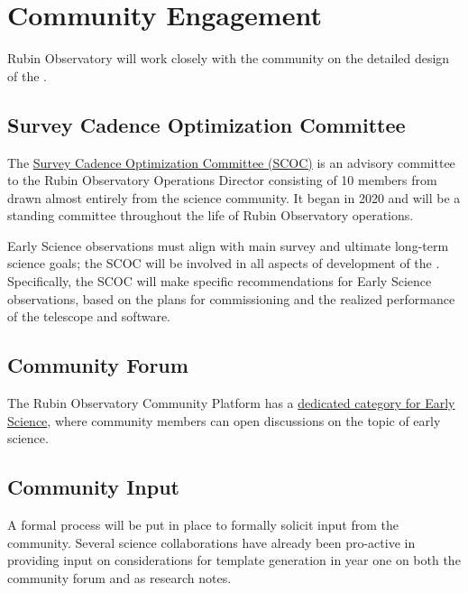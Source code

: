 \section{Community Engagement}

Rubin Observatory will work closely with the community on the detailed design of the \esp. 

\subsection{Survey Cadence Optimization Committee}
The \href{https://www.lsst.org/content/charge-survey-cadence-optimization-committee-scoc}{Survey Cadence Optimization Committee (SCOC)} is an advisory committee to the Rubin Observatory Operations Director consisting of 10 members from drawn almost entirely from the science community.
It began in 2020 and will be a standing committee throughout the life of Rubin Observatory operations. 

Early Science observations must align with main survey and ultimate long-term science goals; the SCOC will be involved in all aspects of development of the \esp. 
Specifically, the SCOC will make specific recommendations for Early Science observations, based on the plans for commissioning and the realized performance of the telescope and software. 


\subsection{Community Forum}

The Rubin Observatory Community Platform has a \href{https://community.lsst.org/t/about-the-early-science-category/5775}{dedicated category for Early Science}, where  community members can open discussions on the topic of early science. 

\subsection{Community Input}

A formal process will be put in place to formally solicit input from the community. 
Several science collaborations have already been pro-active in providing input on considerations for template generation in year one on both the community forum and as research notes. 
